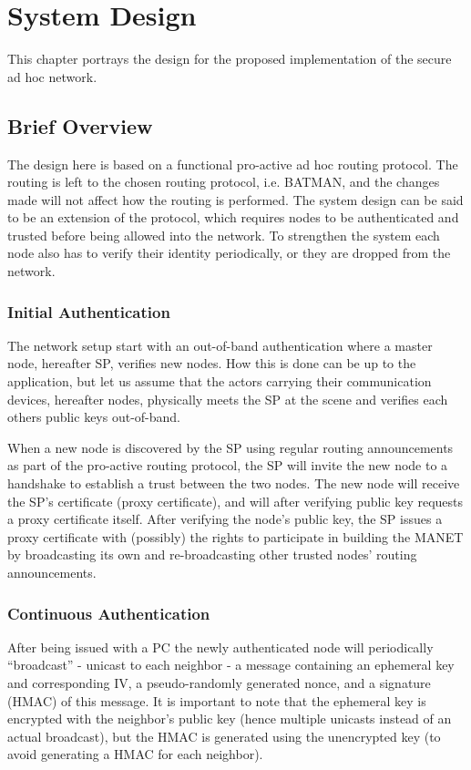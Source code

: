 \chapter{System Design}
\label{ch:design}
\acresetall

This chapter portrays the design for the proposed implementation of the secure
ad hoc network.

\section{Brief Overview}
The design here is based on a functional pro-active ad hoc routing protocol. The
routing is left to the chosen routing protocol, i.e. \ac{BATMAN}, and the
changes made will not affect how the routing is performed. The system design can
be said to be an extension of the protocol, which requires nodes to be
authenticated and trusted before being allowed into the network. To strengthen
the system each node also has to verify their identity periodically, or they are
dropped from the network.


\subsection{Initial Authentication}
The network setup start with an out-of-band authentication where a master node,
hereafter \ac{SP}, verifies new nodes. How this is done can be up to the
application, but let us assume that the actors carrying their communication
devices, hereafter nodes, physically meets the \ac{SP} at the scene and verifies
each others public keys out-of-band.

When a new node is discovered by the \ac{SP} using regular routing announcements
as part of the pro-active routing protocol, the \ac{SP} will invite the new node
to a handshake to establish a trust between the two nodes. The new node will
receive the \ac{SP}'s certificate (proxy certificate), and will after verifying
public key requests a proxy certificate itself. After verifying the node's
public key, the \ac{SP} issues a proxy certificate with (possibly) the rights to
participate in building the \ac{MANET} by broadcasting its own and
re-broadcasting other trusted nodes' routing announcements.

\subsection{Continuous Authentication}
After being issued with a \ac{PC} the newly authenticated node will periodically
``broadcast'' - unicast to each neighbor - a message containing an ephemeral key
and corresponding \ac{IV}, a pseudo-randomly generated nonce, and a signature (HMAC)
of this message. It is important to note that the ephemeral key is encrypted
with the neighbor's public key (hence multiple unicasts instead of an actual
broadcast), but the HMAC is generated using the unencrypted key (to avoid
generating a HMAC for each neighbor).


